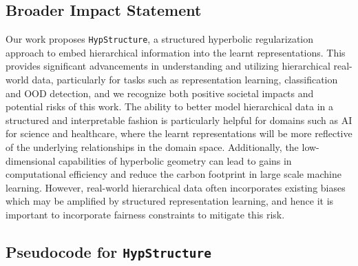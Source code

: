 \subsection{Broader Impact Statement}
\label{app:broader_impact} 
Our work proposes \texttt{HypStructure}, a structured hyperbolic regularization approach to embed hierarchical information into the learnt representations. This provides significant advancements in understanding and utilizing hierarchical real-world data, particularly for tasks such as representation learning, classification and OOD detection, and we recognize both positive societal impacts and potential risks of this work. 
The ability to better model hierarchical data in a structured and interpretable fashion is particularly helpful for domains such as AI for science and healthcare, where the learnt representations will be more reflective of the underlying relationships in the domain space. Additionally, the low-dimensional capabilities of hyperbolic geometry can lead to gains in computational efficiency and reduce the carbon footprint in large scale machine learning. However, real-world hierarchical data often incorporates existing biases which may be amplified by structured representation learning, and hence it is important to incorporate fairness constraints to mitigate this risk.


\subsection{Pseudocode for \texttt{HypStructure}}
\label{app:pseudocode} 

